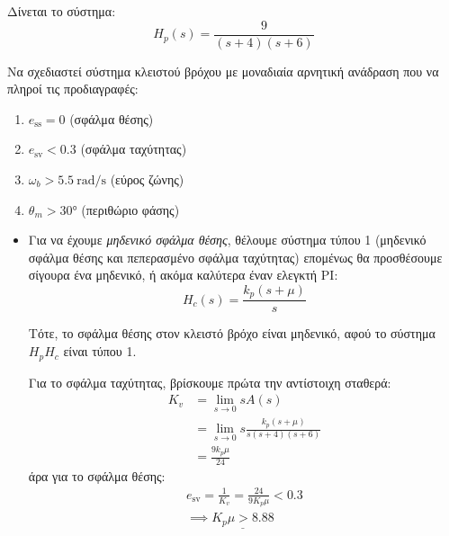 \documentclass[11pt,a4paper,notitlepage,fleqn,final]{article}
\begin{document}
\begin{exercise}
Δίνεται το σύστημα:
\[
H_p(s) = \frac{9}{(s+4)(s+6)}
\]

Να σχεδιαστεί σύστημα κλειστού βρόχου με μοναδιαία αρνητική ανάδραση που να πληροί τις προδιαγραφές:
\begin{enumerate}
	\item \( e_{\mathrm{ss}} = 0 \) (σφάλμα θέσης)
    \item \( e_{\mathrm{sv}} < 0.3 \) (σφάλμα ταχύτητας)
    \item \( \omega_b > \SI{5.5}{\radian/\second} \) (εύρος ζώνης)
    \item \( \theta_m > \ang{30} \) (περιθώριο φάσης)
\end{enumerate}


\tcblower
\begin{itemize}
	\item
	Για να έχουμε \textit{μηδενικό σφάλμα θέσης}, θέλουμε σύστημα τύπου 1 (μηδενικό σφάλμα θέσης
	και πεπερασμένο σφάλμα ταχύτητας) επομένως θα προσθέσουμε σίγουρα ένα μηδενικό, ή ακόμα
	καλύτερα έναν ελεγκτή PI:
	\[
	H_c(s) = \frac{k_p (s+μ)}{s}
	\]
	
	Τότε, το σφάλμα θέσης στον κλειστό βρόχο είναι μηδενικό, αφού το σύστημα \( H_pH_c \)
	είναι τύπου 1.
	
	Για το σφάλμα ταχύτητας, βρίσκουμε πρώτα την αντίστοιχη σταθερά:
	\begin{align*}
		K_v &= \lim_{s\to 0}sA(s) \\
		&= \lim_{s\to 0} s \frac{k_p(s+μ)}{s(s+4)(s+6)}
		\\ &= \frac{9k_pμ}{24}
	\end{align*}
	άρα για το σφάλμα θέσης:
	\begin{gather*}
		e_{\mathrm{sv}} = \frac{1}{K_v} = \frac{24}{9K_pμ} < 0.3 \\
		\implies \underline{K_p μ > 8.88}
	\end{gather*}
	

\end{itemize}
\end{exercise}
\end{document}
